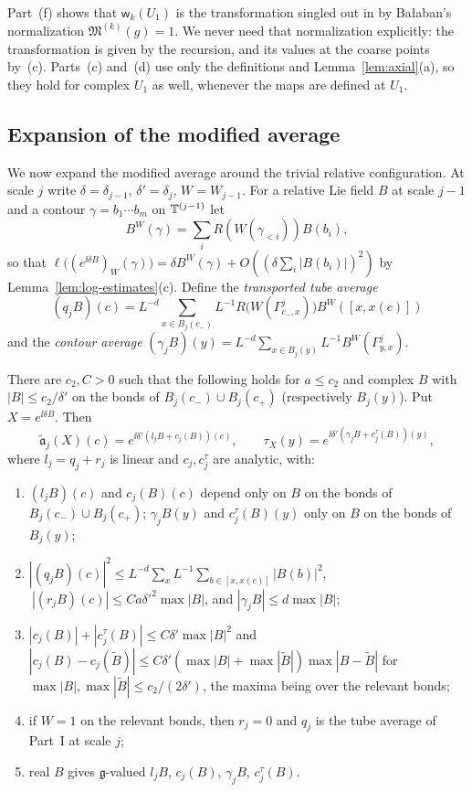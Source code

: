 Part~(f) shows that $\mathsf w_k(U_1)$ is the transformation singled out in \cite[(1.29)]{BalReg} by Ba\l aban's normalization $\mathfrak M^{(k)}(g)=1$. We never need that normalization explicitly: the transformation is given by the recursion, and its values at the coarse points by~(c). Parts~(c) and~(d) use only the definitions and Lemma~\ref{lem:axial}(a), so they hold for complex $U_1$ as well, whenever the maps are defined at $U_1$.

\subsection{Expansion of the modified average}

We now expand the modified average around the trivial relative configuration. At scale $j$ write $\delta=\delta_{j-1}$, $\delta'=\delta_j$, $W=W_{j-1}$. For a relative Lie field $B$ at scale $j-1$ and a contour $\gamma=b_1\cdots b_m$ on $\mathbb T^{(j-1)}$ let
\[
B^W(\gamma)=\sum_iR(W(\gamma_{<i}))B(b_i),
\]
so that $\ell\big((e^{\ii\delta B})_W(\gamma)\big)=\delta B^W(\gamma)+O((\delta\sum_i|B(b_i)|)^2)$ by Lemma~\ref{lem:log-estimates}(c). Define the \emph{transported tube average}
\[
(q_jB)(c)=L^{-d}\sum_{x\in B_j(c_-)}L^{-1}R\big(W(\Gamma^j_{c_-,x})\big)B^W([x,x(c)])
\]
\cite[(125)]{BalAvg} and the \emph{contour average} $(\gamma_jB)(y)=L^{-d}\sum_{x\in B_j(y)}L^{-1}B^W(\Gamma^j_{y,x})$.

\begin{lemma}\label{lem:one-step-expansion}
There are $c_2,C>0$ such that the following holds for $a\le c_2$ and complex $B$ with $|B|\le c_2/\delta'$ on the bonds of $B_j(c_-)\cup B_j(c_+)$ (respectively $B_j(y)$). Put $X=e^{\ii\delta B}$. Then
\[
\tilde{\mathfrak a}_j(X)(c)=e^{\ii\delta'(l_jB+c_j(B))(c)},\qquad \tau_X(y)=e^{\ii\delta'(\gamma_jB+c^\tau_j(B))(y)},
\]
where $l_j=q_j+r_j$ is linear and $c_j,c_j^\tau$ are analytic, with:
\begin{enumerate}[label=(\alph*)]
\item $(l_jB)(c)$ and $c_j(B)(c)$ depend only on $B$ on the bonds of $B_j(c_-)\cup B_j(c_+)$; $\gamma_jB(y)$ and $c^\tau_j(B)(y)$ only on $B$ on the bonds of $B_j(y)$;
\item $|(q_jB)(c)|^2\le L^{-d}\sum_xL^{-1}\sum_{b\in[x,x(c)]}|B(b)|^2$, $\ |(r_jB)(c)|\le Ca\delta'^2\max|B|$, and $|\gamma_jB|\le d\max|B|$;
\item $|c_j(B)|+|c^\tau_j(B)|\le C\delta'\max|B|^2$ and $|c_j(B)-c_j(\tilde B)|\le C\delta'(\max|B|+\max|\tilde B|)\max|B-\tilde B|$ for $\max|B|,\max|\tilde B|\le c_2/(2\delta')$, the maxima being over the relevant bonds;
\item if $W=1$ on the relevant bonds, then $r_j=0$ and $q_j$ is the tube average of Part~I at scale $j$;
\item real $B$ gives $\mathfrak g$-valued $l_jB$, $c_j(B)$, $\gamma_jB$, $c_j^\tau(B)$.
\end{enumerate}
\end{lemma}

